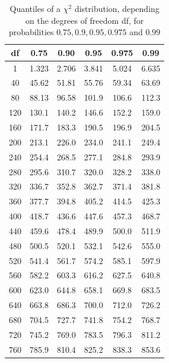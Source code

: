\documentclass[11pt,a4paper%
addpoints, 
]{exam}
\begin{document}
\begin{table}
	\begin{center}
	\begin{tabular}{ |c|c|c|c|c|c| } 
		\hline
		df & 0.75 & 0.90 & 0.95 & 0.975 & 0.99\\
		\hline
	1 & 1.323  & 2.706 & 3.841 & 5.024 & 6.635 \\
	40 & 45.62 & 51.81 & 55.76 & 59.34 & 63.69 \\
	80 & 88.13 &  96.58 & 101.9 & 106.6 & 112.3 \\
	120 & 130.1 & 140.2 & 146.6 & 152.2 & 159.0 \\
	160 & 171.7 & 183.3 & 190.5 & 196.9 & 204.5 \\
	200 & 213.1 & 226.0 & 234.0 & 241.1 & 249.4 \\
	240 & 254.4 & 268.5 & 277.1 & 284.8 & 293.9 \\
	280 & 295.6 & 310.7 & 320.0 & 328.2 & 338.0 \\
	320 & 336.7 & 352.8 & 362.7 & 371.4 & 381.8 \\
	360 & 377.7 & 394.8 & 405.2 & 414.5 & 425.3 \\
	400 & 418.7 & 436.6 & 447.6 & 457.3 & 468.7 \\
	440 & 459.6 & 478.4 & 489.9 & 500.0 & 511.9 \\
	480 & 500.5 & 520.1 & 532.1 & 542.6 & 555.0 \\
	520 & 541.4 & 561.7 & 574.2 & 585.1 & 597.9 \\
	560 & 582.2 & 603.3 & 616.2 & 627.5 & 640.8 \\
	600 & 623.0 & 644.8 & 658.1 & 669.8 & 683.5 \\
	640 & 663.8 & 686.3 & 700.0 & 712.0 & 726.2 \\
	680 & 704.5 & 727.7 & 741.8 & 754.2 & 768.7 \\
	720 & 745.2 & 769.0 & 783.5 & 796.3 & 811.2 \\
	760 & 785.9 & 810.4 & 825.2 & 838.3 & 853.6 \\
			\hline
	\end{tabular}
\caption{Quantiles of a $\chi^2$ distribution, depending on the degrees of freedom df, for probabilities $0.75, 0.9, 0.95, 0.975$ and $0.99$}
\end{center}
\end{table}



\end{document}
